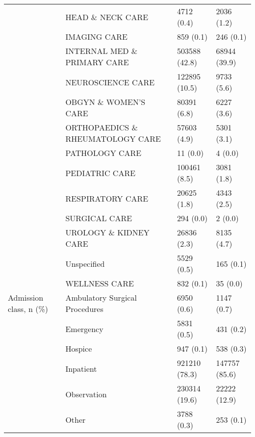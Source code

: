 \begin{tabular}{llll}
                                       & HEAD \& NECK CARE &         4712 (0.4) &         2036 (1.2) \\
                                       & IMAGING CARE &          859 (0.1) &          246 (0.1) \\
                                       & INTERNAL MED \& PRIMARY CARE &      503588 (42.8) &       68944 (39.9) \\
                                       & NEUROSCIENCE CARE &      122895 (10.5) &         9733 (5.6) \\
                                       & OBGYN \& WOMEN'S CARE &        80391 (6.8) &         6227 (3.6) \\
                                       & ORTHOPAEDICS \& RHEUMATOLOGY CARE &        57603 (4.9) &         5301 (3.1) \\
                                       & PATHOLOGY CARE &           11 (0.0) &            4 (0.0) \\
                                       & PEDIATRIC CARE &       100461 (8.5) &         3081 (1.8) \\
                                       & RESPIRATORY CARE &        20625 (1.8) &         4343 (2.5) \\
                                       & SURGICAL CARE &          294 (0.0) &            2 (0.0) \\
                                       & UROLOGY \& KIDNEY CARE &        26836 (2.3) &         8135 (4.7) \\
                                       & Unspecified &         5529 (0.5) &          165 (0.1) \\
                                       & WELLNESS CARE &          832 (0.1) &           35 (0.0) \\
Admission class, n (\%) & Ambulatory Surgical Procedures &         6950 (0.6) &         1147 (0.7) \\
                                       & Emergency &         5831 (0.5) &          431 (0.2) \\
                                       & Hospice &          947 (0.1) &          538 (0.3) \\
                                       & Inpatient &      921210 (78.3) &      147757 (85.6) \\
                                       & Observation &      230314 (19.6) &       22222 (12.9) \\
                                       & Other &         3788 (0.3) &          253 (0.1) \\

\end{tabular}
